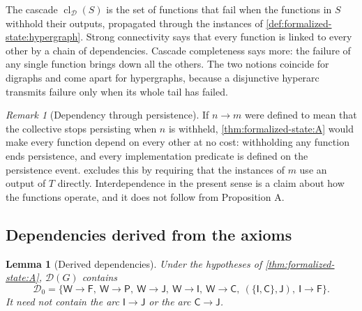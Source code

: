 \documentclass[11pt,letterpaper]{article}
\newtheorem{lemma}[theorem]{Lemma}
\theoremstyle{definition}
\theoremstyle{remark}
\newtheorem{remark}[theorem]{Remark}
\newcommand{\pF}{\mathsf{F}}
\newcommand{\pP}{\mathsf{P}}
\newcommand{\pJ}{\mathsf{J}}
\newcommand{\pI}{\mathsf{I}}
\newcommand{\pC}{\mathsf{C}}
\newcommand{\pW}{\mathsf{W}}
\newcommand{\Dzero}{\mathcal{D}_0}
\newcommand{\cl}{\operatorname{cl}}
\begin{document}
The cascade $\cl_{\mathcal{D}}(S)$ is the set of functions that fail when the functions in $S$ withhold their outputs, propagated through the instances of \cref{def:formalized-state:hypergraph}. Strong connectivity says that every function is linked to every other by a chain of dependencies. Cascade completeness says more: the failure of any single function brings down all the others. The two notions coincide for digraphs and come apart for hypergraphs, because a disjunctive hyperarc transmits failure only when its whole tail has failed.

\begin{remark}[Dependency through persistence]
\label{rem:formalized-state:persistence}
If $n\to m$ were defined to mean that the collective stops persisting when $n$ is withheld, \cref{thm:formalized-state:A} would make every function depend on every other at no cost: withholding any function ends persistence, and every implementation predicate is defined on the persistence event.  excludes this by requiring that the instances of $m$ use an output of $T$ directly. Interdependence in the present sense is a claim about how the functions operate, and it does not follow from Proposition A.
\end{remark}

\subsection{Dependencies derived from the axioms}

\begin{lemma}[Derived dependencies]
\label{lem:formalized-state:D0}
Under the hypotheses of \cref{thm:formalized-state:A}, $\mathcal{D}(G)$ contains
\[
\Dzero=\bigl\{\pW\to\pF,\ \pW\to\pP,\ \pW\to\pJ,\ \pW\to\pI,\ \pW\to\pC,\ (\{\pI,\pC\},\pJ),\ \pI\to\pF\bigr\}.
\]
It need not contain the arc $\pI\to\pJ$ or the arc $\pC\to\pJ$.
\end{lemma}
\end{document}
